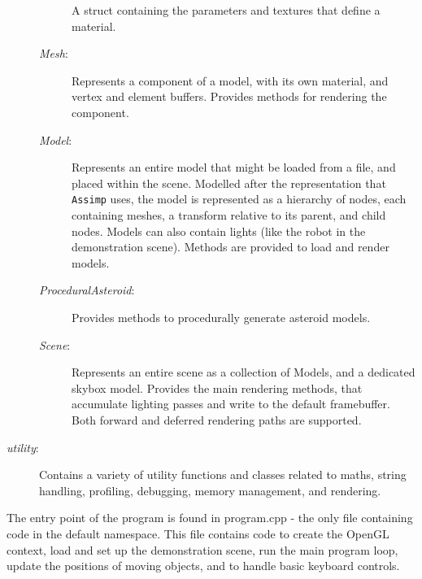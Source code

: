 \documentclass[11pt]{scrartcl} %
\newcommand{\libraryname}[1]{{\texttt{#1}}}
\newcommand{\codefile}[1]{{\textit{#1}}}
\begin{document}
\begin{description}
\begin{description}
                    A struct containing the parameters and textures that define a material.

                \item[\codefile{Mesh}:]

                    Represents a component of a model, with its own material,
                    and vertex and element buffers. Provides methods for
                    rendering the component.

                \item[\codefile{Model}:]

                    Represents an entire model that might be loaded from a
                    file, and placed within the scene. Modelled after the
                    representation that \libraryname{Assimp} uses, the model is
                    represented as a hierarchy of nodes, each containing
                    meshes, a transform relative to its parent, and child
                    nodes. Models can also contain lights (like the robot in
                    the demonstration scene).
                    Methods are provided to load and render models.

                \item[\codefile{ProceduralAsteroid}:]

                    Provides methods to procedurally generate asteroid models.

                \item[\codefile{Scene}:]

                    Represents an entire scene as a collection of Models, and a
                    dedicated skybox model. Provides the main rendering
                    methods, that accumulate lighting passes and write to the
                    default framebuffer. Both forward and deferred rendering
                    paths are supported.

            \end{description}

        \item[\codefile{utility}:]

            Contains a variety of utility functions and classes related to
            maths, string handling, profiling, debugging, memory
            management, and rendering.

    \end{description}

    The entry point of the program is found in program.cpp - the only file
    containing code in the default namespace. This file contains code to create
    the OpenGL context, load and set up the demonstration scene, run the main
    program loop, update the positions of moving objects, and to handle basic
    keyboard controls.
\end{document}
